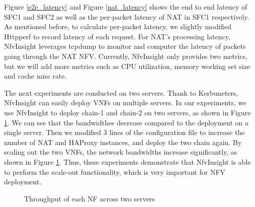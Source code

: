 Figure \ref{e2e_latency} and Figure \ref{nat_latency} 
shows the end to end latency of SFC1 and SFC2 
as well as the per-packet latency of NAT in SFC1 respectively.
As mentioned before, to calculate per-packet latency, 
we slightly modified Httpperf to record latency of each request. 
For NAT's processing latency, NfvInsight leverages tcpdump to 
monitor and computer the latency of packets going through the NAT NFV. 
Currently, NfvInsight only provides two metrics, but we will add 
more metrics such as CPU utilization, memory working set size and cache miss rate.

The next experiments are conducted on two servers. Thank to 
Kerbuneters, NfvInsight can easily deploy VNFs on multiple servers. 
In our experiments, we use NfvInsight to deploy chain-1 and chain-2 
on two servers, as shown in Figure \ref{inter_throughput}. We can
see that the bandwidthes decrease compared to the deployment on
a single server. Then we modified 3 lines of the configuration file 
to increase the number of NAT and HAProxy instances, and deploy
the two chain again. By scaling out the two VNFs, the network 
bandwidths increase significantly, as shown in Figure \ref{inter_throughput}.
Thus, these experiments demonstrate that NfvInsight is able to 
perform the scale-out functionality, which is very important for NFV
deployment. 

\begin{figure}[!t]
\centering
{}
\hfil
{}
\hfil
\caption{Throughput of each NF across two servers}
\label{inter_throughput}
\end{figure}


